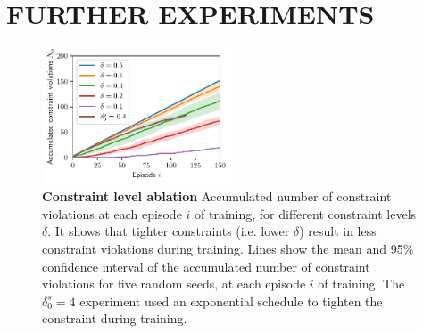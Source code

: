 \documentclass[twoside]{article}
\newcommand{\modeVar}{\ensuremath{\alpha}}
\begin{document}
\section{FURTHER EXPERIMENTS}
\label{sec:orgfa9747a}
\begin{figure}[h]
    \centering
    \includegraphics[width=0.5\textwidth]{../experiments/figures/num_constrint_violations_constraint_levels_ablation.pdf}
    \caption{\textbf{Constraint level ablation} Accumulated number of constraint violations at each episode $i$ of training, for different constraint levels $\delta$.
    It shows that tighter constraints (i.e. lower $\delta$) result in less constraint violations during training.
    Lines show the mean and 95\% confidence interval of the accumulated number of constraint violations for five random seeds, at each episode $i$ of training. The $\delta^{s}_{0}=4$ experiment used an exponential schedule to tighten the constraint during training. }
    \label{fig-num_constrint_violations_constraint_levels_ablation}
\end{figure}
\end{document}
